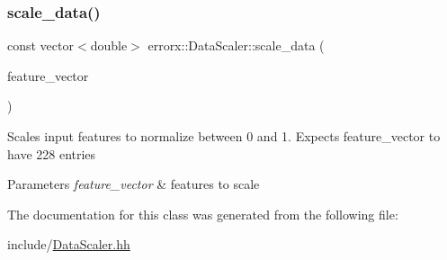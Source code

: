 \subsubsection{\texorpdfstring{scale\+\_\+data()}{scale\_data()}}
{\footnotesize\ttfamily const vector$<$double$>$ errorx\+::\+Data\+Scaler\+::scale\+\_\+data (\begin{DoxyParamCaption}\item[{vector$<$ double $>$ const \&}]{feature\+\_\+vector }\end{DoxyParamCaption})}

Scales input features to normalize between 0 and 1. Expects feature\+\_\+vector to have 228 entries


\begin{DoxyParams}{Parameters}
{\em feature\+\_\+vector} & features to scale \\
\hline
\end{DoxyParams}


The documentation for this class was generated from the following file\+:\begin{DoxyCompactItemize}
\item 
include/\mbox{\hyperlink{_data_scaler_8hh}{Data\+Scaler.\+hh}}\end{DoxyCompactItemize}
